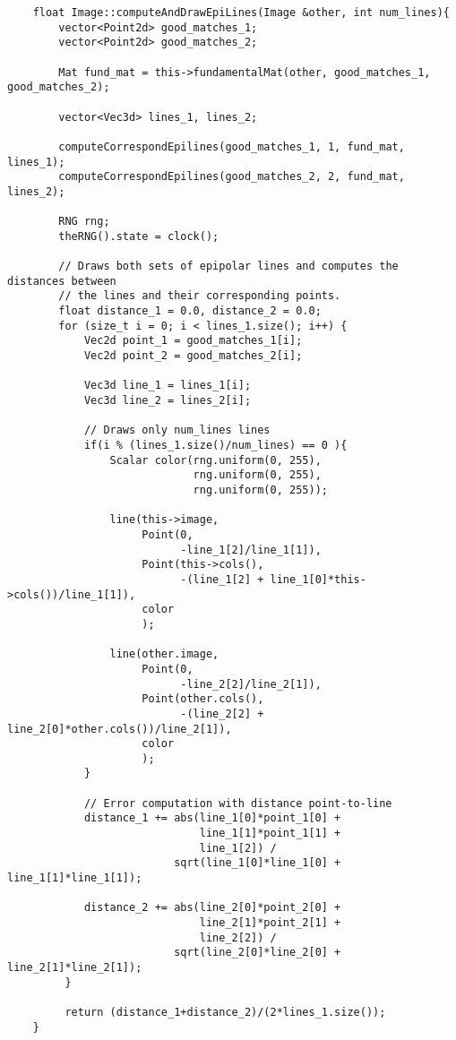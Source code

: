 \documentclass[a4paper, 11pt]{article}
\theoremstyle{definition}
\theoremstyle{theorem}
\begin{document}
    \begin{lstlisting}
    float Image::computeAndDrawEpiLines(Image &other, int num_lines){
        vector<Point2d> good_matches_1;
        vector<Point2d> good_matches_2;

        Mat fund_mat = this->fundamentalMat(other, good_matches_1, good_matches_2);

        vector<Vec3d> lines_1, lines_2;

        computeCorrespondEpilines(good_matches_1, 1, fund_mat, lines_1);
        computeCorrespondEpilines(good_matches_2, 2, fund_mat, lines_2);

        RNG rng;
        theRNG().state = clock();

        // Draws both sets of epipolar lines and computes the distances between
        // the lines and their corresponding points.
        float distance_1 = 0.0, distance_2 = 0.0;
        for (size_t i = 0; i < lines_1.size(); i++) {
            Vec2d point_1 = good_matches_1[i];
            Vec2d point_2 = good_matches_2[i];

            Vec3d line_1 = lines_1[i];
            Vec3d line_2 = lines_2[i];

            // Draws only num_lines lines
            if(i % (lines_1.size()/num_lines) == 0 ){
                Scalar color(rng.uniform(0, 255),
                             rng.uniform(0, 255),
                             rng.uniform(0, 255));

                line(this->image,
                     Point(0,
                           -line_1[2]/line_1[1]),
                     Point(this->cols(),
                           -(line_1[2] + line_1[0]*this->cols())/line_1[1]),
                     color
                     );

                line(other.image,
                     Point(0,
                           -line_2[2]/line_2[1]),
                     Point(other.cols(),
                           -(line_2[2] + line_2[0]*other.cols())/line_2[1]),
                     color
                     );
            }

            // Error computation with distance point-to-line
            distance_1 += abs(line_1[0]*point_1[0] +
                              line_1[1]*point_1[1] +
                              line_1[2]) /
                          sqrt(line_1[0]*line_1[0] + line_1[1]*line_1[1]);

            distance_2 += abs(line_2[0]*point_2[0] +
                              line_2[1]*point_2[1] +
                              line_2[2]) /
                          sqrt(line_2[0]*line_2[0] + line_2[1]*line_2[1]);
         }

         return (distance_1+distance_2)/(2*lines_1.size());
    }
    \end{lstlisting}
\end{document}
